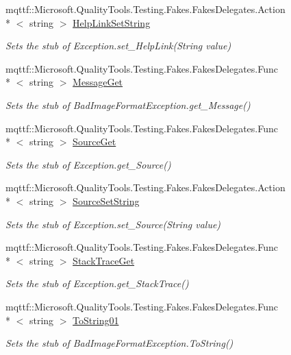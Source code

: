 \begin{DoxyCompactItemize}
mqttf\-::\-Microsoft.\-Quality\-Tools.\-Testing.\-Fakes.\-Fakes\-Delegates.\-Action\\*
$<$ string $>$ \hyperlink{class_system_1_1_fakes_1_1_stub_bad_image_format_exception_a5d572250f550b42073e81ae5cab94a23}{Help\-Link\-Set\-String}
\begin{DoxyCompactList}\small\item\em Sets the stub of Exception.\-set\-\_\-\-Help\-Link(\-String value)\end{DoxyCompactList}\item 
mqttf\-::\-Microsoft.\-Quality\-Tools.\-Testing.\-Fakes.\-Fakes\-Delegates.\-Func\\*
$<$ string $>$ \hyperlink{class_system_1_1_fakes_1_1_stub_bad_image_format_exception_acd69398e0c2125d933c293f201dc956f}{Message\-Get}
\begin{DoxyCompactList}\small\item\em Sets the stub of Bad\-Image\-Format\-Exception.\-get\-\_\-\-Message()\end{DoxyCompactList}\item 
mqttf\-::\-Microsoft.\-Quality\-Tools.\-Testing.\-Fakes.\-Fakes\-Delegates.\-Func\\*
$<$ string $>$ \hyperlink{class_system_1_1_fakes_1_1_stub_bad_image_format_exception_a743a59069733a7c026f9583f8c2c46bc}{Source\-Get}
\begin{DoxyCompactList}\small\item\em Sets the stub of Exception.\-get\-\_\-\-Source()\end{DoxyCompactList}\item 
mqttf\-::\-Microsoft.\-Quality\-Tools.\-Testing.\-Fakes.\-Fakes\-Delegates.\-Action\\*
$<$ string $>$ \hyperlink{class_system_1_1_fakes_1_1_stub_bad_image_format_exception_a830084d6ce562b6d6839daf9b9682cf1}{Source\-Set\-String}
\begin{DoxyCompactList}\small\item\em Sets the stub of Exception.\-set\-\_\-\-Source(\-String value)\end{DoxyCompactList}\item 
mqttf\-::\-Microsoft.\-Quality\-Tools.\-Testing.\-Fakes.\-Fakes\-Delegates.\-Func\\*
$<$ string $>$ \hyperlink{class_system_1_1_fakes_1_1_stub_bad_image_format_exception_a4eef2a7260797ee30450867aa4913540}{Stack\-Trace\-Get}
\begin{DoxyCompactList}\small\item\em Sets the stub of Exception.\-get\-\_\-\-Stack\-Trace()\end{DoxyCompactList}\item 
mqttf\-::\-Microsoft.\-Quality\-Tools.\-Testing.\-Fakes.\-Fakes\-Delegates.\-Func\\*
$<$ string $>$ \hyperlink{class_system_1_1_fakes_1_1_stub_bad_image_format_exception_a0e343c3f0ba454847559770022933efa}{To\-String01}
\begin{DoxyCompactList}\small\item\em Sets the stub of Bad\-Image\-Format\-Exception.\-To\-String()\end{DoxyCompactList}\end{DoxyCompactItemize}
